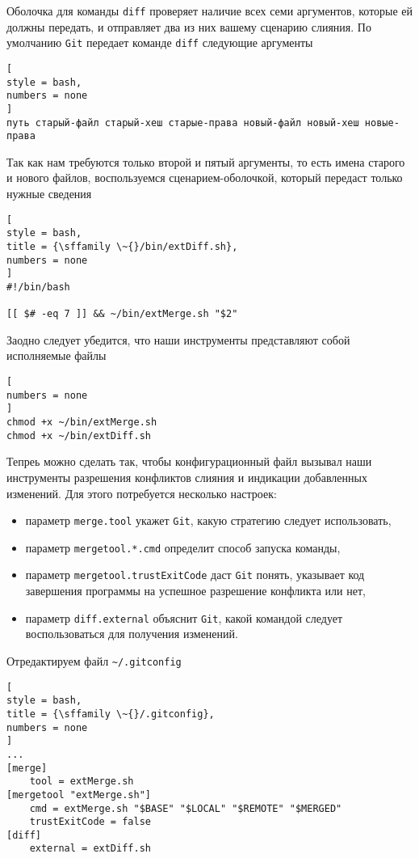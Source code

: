 \documentclass[%
	11pt,
	a4paper,
	utf8,
		]{article}
\begin{document}
Оболочка для команды \texttt{diff} проверяет наличие всех семи аргументов, которые ей должны передать, и отправляет два из них вашему сценарию слияния. По умолчанию \texttt{Git} передает команде \texttt{diff} следующие аргументы
\begin{lstlisting}[
style = bash,
numbers = none
]
путь старый-файл старый-хеш старые-права новый-файл новый-хеш новые-права
\end{lstlisting}

Так как нам требуются только второй и пятый аргументы, то есть имена старого и нового файлов, воспользуемся сценарием-оболочкой, который передаст только нужные сведения
\begin{lstlisting}[
style = bash,
title = {\sffamily \~{}/bin/extDiff.sh},
numbers = none
]
#!/bin/bash

[[ $# -eq 7 ]] && ~/bin/extMerge.sh "$2" 
\end{lstlisting}

Заодно следует убедится, что наши инструменты представляют собой исполняемые файлы
\begin{lstlisting}[
numbers = none
]
chmod +x ~/bin/extMerge.sh
chmod +x ~/bin/extDiff.sh
\end{lstlisting}

Тепреь можно сделать так, чтобы конфигурационный файл вызывал наши инструменты разрешения конфликтов слияния и индикации добавленных изменений. Для этого потребуется несколько настроек:
\begin{itemize}
	\item параметр \verb|merge.tool| укажет \texttt{Git}, какую стратегию следует использовать,
	
	\item параметр \verb|mergetool.*.cmd| определит способ запуска команды,
	
	\item параметр \verb|mergetool.trustExitCode| даст \texttt{Git} понять, указывает код завершения программы на успешное разрешение конфликта или нет, 
	
	\item параметр \texttt{diff.external} объяснит \texttt{Git}, какой командой  следует воспользоваться для получения изменений.
\end{itemize}

Отредактируем файл \verb|~/.gitconfig|
\begin{lstlisting}[
style = bash,
title = {\sffamily \~{}/.gitconfig},
numbers = none
]
...
[merge]
    tool = extMerge.sh
[mergetool "extMerge.sh"]
    cmd = extMerge.sh "$BASE" "$LOCAL" "$REMOTE" "$MERGED"
    trustExitCode = false
[diff]
    external = extDiff.sh
\end{lstlisting}
\end{document}
